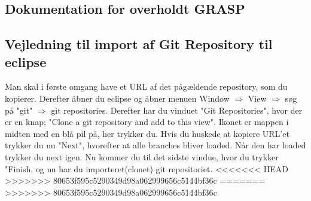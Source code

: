 \subsection{Dokumentation for overholdt GRASP}

\subsection{Vejledning til import af Git Repository til eclipse}
Man skal i første omgang have et URL af det pågældende repository, som du kopierer.
Derefter åbner du eclipse og åbner menuen 
Window $\Rightarrow$ View $\Rightarrow$ søg på "git" $\Rightarrow$ git repositories.
Derefter har du vinduet "Git Repositories", hvor der er en knap; "Clone a git repository and add to this view".
Ikonet er mappen i midten med en blå pil på, her trykker du.
Hvis du huskede at kopiere URL'et trykker du nu "Next", hvorefter at alle branches bliver loaded. Når den har loaded trykker du next igen.
Nu kommer du til det sidste vindue, hvor du trykker "Finish, og nu har du importeret(clonet) git repositoriet.
<<<<<<< HEAD
>>>>>>> 80653f595c5290349d98a062999656c5144bf36c
=======
>>>>>>> 80653f595c5290349d98a062999656c5144bf36c
